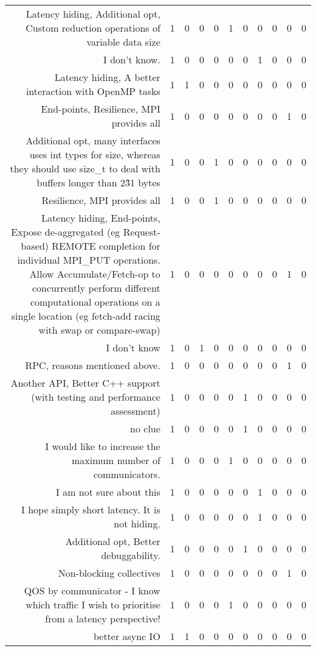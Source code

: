 {\begin{landscape}
\begin{longtable}[htb]{r|c|c|c|c|c|c|c|c|c|c}
{Latency hiding, Additional opt, Custom reduction operations of variable data size} & 1 & 0 & 0 & 0 & 1 & 0 & 0 & 0 & 0 & 0 \\%
{I don't know.} & 1 & 0 & 0 & 0 & 0 & 0 & 1 & 0 & 0 & 0 \\%
{Latency hiding, A better interaction with OpenMP tasks} & 1 & 1 & 0 & 0 & 0 & 0 & 0 & 0 & 0 & 0 \\%
{End-points, Resilience, MPI provides all} & 1 & 0 & 0 & 0 & 0 & 0 & 0 & 0 & 1 & 0 \\%
{Additional opt, many interfaces uses int types for size, whereas they should use size\_t to deal with buffers longer than 2\^31 bytes} & 1 & 0 & 0 & 1 & 0 & 0 & 0 & 0 & 0 & 0 \\%
{Resilience, MPI provides all} & 1 & 0 & 0 & 1 & 0 & 0 & 0 & 0 & 0 & 0 \\%
{Latency hiding, End-points, Expose de-aggregated (eg Request-based) REMOTE completion for individual MPI\_PUT operations. Allow Accumulate/Fetch-op to concurrently perform different computational operations on a single location (eg fetch-add racing with swap or compare-swap)} & 1 & 0 & 0 & 0 & 0 & 0 & 0 & 0 & 1 & 0 \\%
{I don't know} & 1 & 0 & 1 & 0 & 0 & 0 & 0 & 0 & 0 & 0 \\%
{RPC, reasons mentioned above.} & 1 & 0 & 0 & 0 & 0 & 0 & 0 & 0 & 1 & 0 \\%
{Another API, Better C++ support (with testing and performance assessment)} & 1 & 0 & 0 & 0 & 0 & 1 & 0 & 0 & 0 & 0 \\%
{no clue} & 1 & 0 & 0 & 0 & 0 & 1 & 0 & 0 & 0 & 0 \\%
{I would like to increase the maximum number of communicators.} & 1 & 0 & 0 & 0 & 1 & 0 & 0 & 0 & 0 & 0 \\%
{I am not sure about this} & 1 & 0 & 0 & 0 & 0 & 0 & 1 & 0 & 0 & 0 \\%
{I hope simply short latency.  It is not hiding.} & 1 & 0 & 0 & 0 & 0 & 0 & 1 & 0 & 0 & 0 \\%
{Additional opt, Better debuggability.} & 1 & 0 & 0 & 0 & 0 & 1 & 0 & 0 & 0 & 0 \\%
{Non-blocking collectives} & 1 & 0 & 0 & 0 & 0 & 0 & 0 & 0 & 1 & 0 \\%
{QOS by communicator - I know which traffic I wish to prioritise from a latency perspective!} & 1 & 0 & 0 & 0 & 1 & 0 & 0 & 0 & 0 & 0 \\%
{better async IO} & 1 & 1 & 0 & 0 & 0 & 0 & 0 & 0 & 0 & 0 \\%

\end{longtable}
\end{landscape}}
